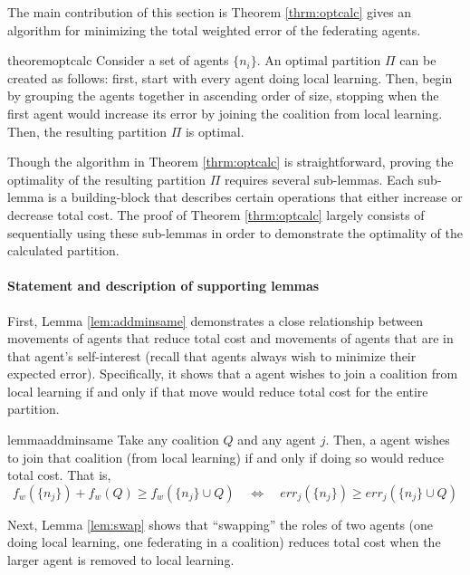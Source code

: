 \documentclass{article}
\newcommand{\ndraw}[0]{\ensuremath{n}}
\newcommand{\costw}[0]{\ensuremath{f_w}}
\newcommand{\partition}[0]{\ensuremath{\Pi}}
\begin{document}
The main contribution of this section is Theorem \ref{thrm:optcalc} gives an algorithm for minimizing the total weighted error of the federating agents. 

\begin{restatable}{theorem}{optcalc}
\label{thrm:optcalc}
Consider a set of agents $\{\ndraw_i\}$. An optimal partition $\partition$ can be created as follows: first, start with every agent doing local learning. Then, begin by grouping the agents together in ascending order of size, stopping when the first agent would increase its error by joining the coalition from local learning. Then, the resulting partition $\partition$ is optimal.
\end{restatable}

Though the algorithm in Theorem \ref{thrm:optcalc} is straightforward, proving the optimality of the resulting partition $\partition$ requires several sub-lemmas. Each sub-lemma is a building-block that describes certain operations that either increase or decrease total cost. The proof of Theorem \ref{thrm:optcalc} largely consists of sequentially using these sub-lemmas in order to demonstrate the optimality of the calculated partition.

\paragraph{\bf Statement and description of supporting lemmas} First, Lemma \ref{lem:addminsame} demonstrates a close relationship between movements of agents that reduce total cost and movements of agents that are in that agent's self-interest (recall that agents always wish to minimize their expected error). Specifically, it shows that a agent wishes to join a coalition from local learning if and only if that move would reduce total cost for the entire partition. 

\begin{restatable}{lemma}{addminsame}
\label{lem:addminsame}
Take any coalition $Q$ and any agent $j$. Then, a agent wishes to join that coalition (from local learning) if and only if doing so would reduce total cost. That is, 
$$\costw(\{\ndraw_j\}) + \costw(Q) \geq \costw(\{\ndraw_j\} \cup Q) \quad \Leftrightarrow \quad err_j(\{\ndraw_j\}) \geq err_j(\{\ndraw_j\} \cup Q)$$
\end{restatable}

Next, Lemma \ref{lem:swap} shows that \enquote{swapping} the roles of two agents (one doing local learning, one federating in a coalition) reduces total cost when the larger agent is removed to local learning. 
\end{document}
